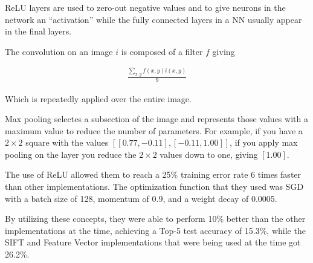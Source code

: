 \documentclass[english,course]{Notes}
\begin{document}
ReLU layers are used to zero-out negative values and to give neurons in the network an ``activation'' while the fully connected layers in a NN usually appear in the final layers. 

The convolution on an image $i$ is composed of a filter $f$ giving

\begin{align*}
  \frac{\sum_{x,y}f(x,y)i(x,y)}{9}
\end{align*}

Which is repeatedly applied over the entire image. 

Max pooling selectes a subsection of the image and represents those values with a maximum value to reduce the number of parameters. For example, if you have a $2\times 2$ square with the values $[[0.77, -0.11],[-0.11,1.00]]$, if you apply max pooling on the layer you reduce the $2\times 2$ values down to one, giving $[1.00]$. 

The use of ReLU allowed them to reach a 25\% training error rate 6 times faster than other implementations. The optimization function that they used was SGD with a batch size of 128, momentum of 0.9, and a weight decay of 0.0005. 

By utilizing these concepts, they were able to perform 10\% better than the other implementations at the time, achieving a Top-5 test accuracy of 15.3\%, while the SIFT and Feature Vector implementations that were being used at the time got 26.2\%.
\end{document}
